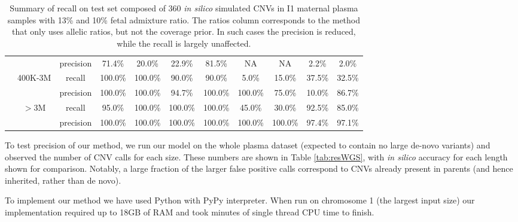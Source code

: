\begin{table}[t]
\begin{tabular}{c|c|c||c|c||c|c||c|c||c|c}
    &        &    precision    &    71.4\%    &    20.0\%    &    22.9\%    &    81.5\%    &    NA    &    NA    &    2.2\%    &    2.0\%    \\    
    &    400K-3M    &    recall    &    100.0\%    &    100.0\%    &    90.0\%    &    90.0\%    &    5.0\%    &    15.0\%    &    37.5\%    &    32.5\%    \\    
    &        &    precision    &    100.0\%    &    100.0\%    &    94.7\%    &    100.0\%    &    100.0\%    &    75.0\%    &    10.0\%    &    86.7\%    \\    
    &    $>$3M    &    recall    &    95.0\%    &    100.0\%    &    100.0\%    &    100.0\%    &    45.0\%    &    30.0\%    &    92.5\%    &    85.0\%    \\    
    &        &    precision    &    100.0\%    &    100.0\%    &    100.0\%    &    100.0\%    &    100.0\%    &    100.0\%    &    97.4\%    &    97.1\%    \\   	
\end{tabular}
\vspace{3pt}
\caption{Summary of recall on test set composed of 360 \emph{in silico} simulated CNVs in I1 maternal plasma samples with 13\% and 10\% fetal admixture ratio. The ratios column corresponds to the method that only uses allelic ratios, but not the coverage prior. In such cases the precision is reduced, while the recall is largely unaffected.  }
\label{tab:resRecall} 
\end{table}

To test precision of our method, we run our model on the whole plasma dataset (expected to contain no large de-novo variants) and observed the number of CNV calls for each size. These numbers are shown in Table \ref{tab:resWGS}, with \textit{in silico} accuracy for each length shown for comparison. Notably, a large fraction of the larger false positive calls correspond to CNVs already present in parents (and hence inherited, rather than de novo). 

To implement our method we have used Python with PyPy interpreter. When run on chromosome 1 (the largest input size) our implementation required up to 18GB of RAM and took  minutes of single thread CPU time to finish.

